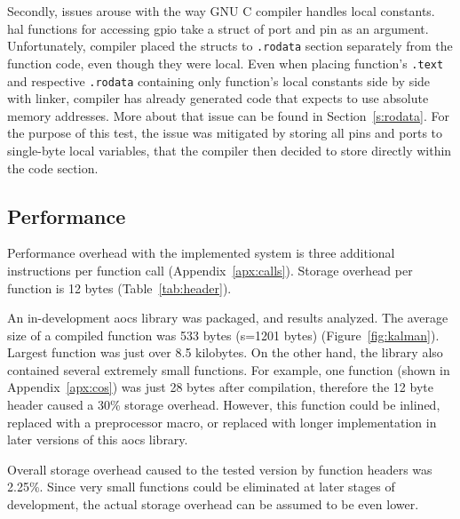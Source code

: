 Secondly, issues arouse with the way GNU C compiler handles local constants. \Gls{hal} functions for accessing \gls{gpio} take a struct of port and pin as an argument. Unfortunately, compiler placed the structs to \texttt{.rodata} section separately from the function code, even though they were local. Even when placing function's \texttt{.text} and respective \texttt{.rodata} containing only function's local constants side by side with linker, compiler has already generated code that expects to use absolute memory addresses. More about that issue can be found in Section~\ref{s:rodata}. For the purpose of this test, the issue was mitigated by storing all pins and ports to single-byte local variables, that the compiler then decided to store directly within the code section.

\subsection{Performance}

Performance overhead with the implemented system is three additional instructions per function call (Appendix~\ref{apx:calls}). Storage overhead per function is 12 bytes (Table~\ref{tab:header}).

An in-development \gls{aocs} library was packaged, and results analyzed. The average size of a compiled function was 533 bytes (s=1201 bytes) (Figure~\ref{fig:kalman}). Largest function was just over 8.5 kilobytes. On the other hand, the library also contained several extremely small functions. For example, one function (shown in Appendix~\ref{apx:cos}) was just 28 bytes after compilation, therefore the 12 byte header caused a 30\% storage overhead. However, this function could be inlined, replaced with a preprocessor macro, or replaced with longer implementation in later versions of this \gls{aocs} library.

Overall storage overhead caused to the tested version by function headers was 2.25\%. Since very small functions could be eliminated at later stages of development, the actual storage overhead can be assumed to be even lower.

